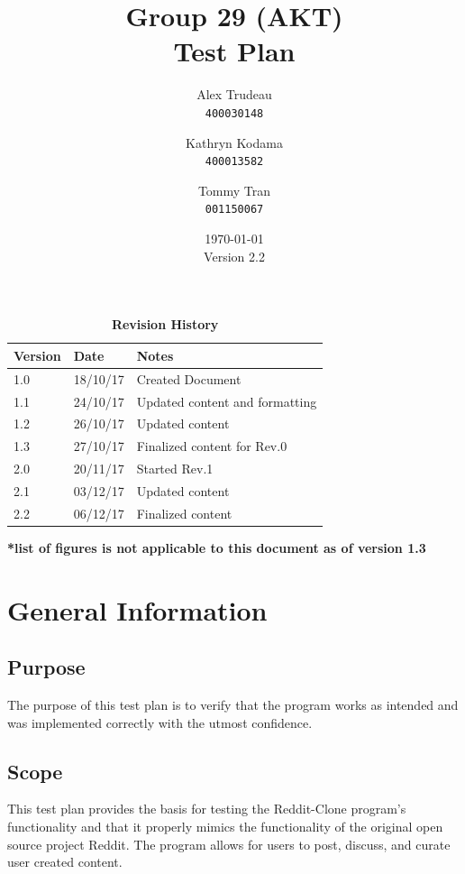 \documentclass[12pt,fleqn]{article}
\title{Group 29 (AKT)\\ Test Plan}
\author{
Alex Trudeau\\
	\texttt{400030148}
\and
Kathryn Kodama\\
  	\texttt{400013582}
\and
Tommy Tran\\
	\texttt{001150067}
}
\date{\today\\Version 2.2}
\begin{document}
\maketitle



\pagebreak


\tableofcontents

\listoftables

\begin{table}[ht]
\caption{\bf Revision History}
\begin{tabularx}{\textwidth}{p{3cm}p{2cm}X}
\toprule {\bf Version} & {\bf Date} & {\bf Notes}\\
\midrule
1.0 & 18/10/17 & Created Document\\
1.1 & 24/10/17 & Updated  content and formatting\\
1.2 & 26/10/17 & Updated content\\
1.3 & 27/10/17 & Finalized content for Rev.0 \\
\leavevmode\color{red}2.0 & \leavevmode\color{red}20/11/17 & \leavevmode\color{red}Started Rev.1 \\
\leavevmode\color{red}2.1 & \leavevmode\color{red}03/12/17 & \leavevmode\color{red}Updated content\\
\leavevmode\color{red}2.2 & \leavevmode\color{red}06/12/17 & \leavevmode\color{red}Finalized content \\
\bottomrule
\end{tabularx}
\textbf{*list of figures is not applicable to this document as of version 1.3}
\end{table}



\clearpage



\section {General Information}

\subsection {Purpose}
The purpose of this test plan is to verify that the program works as intended and was implemented correctly with the utmost confidence.

\subsection {Scope}
This test plan provides the basis for testing the Reddit-Clone program's functionality and that it properly mimics the functionality of the original open source project Reddit.  The program allows for users to post, discuss, and curate user created content.
\end{document}
